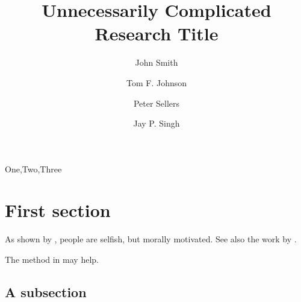 \documentclass[1p]{afparticle}
\begin{document}
\title[Research Title]{Unnecessarily Complicated Research Title}
\author*{John Smith}
\address{Department, University, City, State, Country, Phone, E-mail}
\author{Tom F. Johnson}
\address{Department, University, City, State, Country}
\author{Peter Sellers}
\address{Department, University, City, State, Country}
\author{Jay P. Singh}
\address{Department, University, City, State, Country}
\renewcommand\shortauthors{John Smith et al}
\begin{abstract}
  \lipsum[1]
\end{abstract}
\begin{keyword}
  One\sep Two\sep Three
\end{keyword}


\maketitle

\section{First section}
\lipsum[2]

As shown by \citet{Haidt07}, people are selfish, but morally
motivated.  See also the work by
\citet{Stapel08042011}. 

The method in \citep{Zintzaras10} may help.

\subsection{A subsection}

\lipsum[4]
\end{document}
